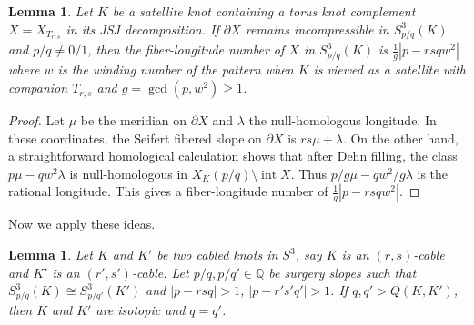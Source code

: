 \documentclass{amsart} %
\newcommand{\Q}{\mathbb{Q}}
\theoremstyle{thm}
\newtheorem{lem}[Theorem]{Lemma}
\theoremstyle{definition}
\numberwithin{equation}{section}
\begin{document}
\begin{lem}\label{lem:fiber_long_torus_piece}
Let $K$ be a satellite knot containing a torus knot complement $X=X_{T_{r,s}}$ in its JSJ decomposition. If $\partial X$ remains incompressible in $S^3_{p/q}(K)$ and $p/q\neq 0/1$, then the fiber-longitude number of $X$ in $S^3_{p/q}(K)$ is $\frac{1}{g}|p-rsqw^2|$ where $w$ is the winding number of the pattern when $K$ is viewed as a satellite with companion $T_{r,s}$ and $g=\gcd(p,w^2)\geq 1$.
\end{lem}
\begin{proof}
Let $\mu$ be the meridian on $\partial X$ and $\lambda$ the null-homologous longitude. In these coordinates, the Seifert fibered slope on $\partial X$ is $rs \mu + \lambda$. On the other hand, a straightforward homological calculation \cite{Gordon1983Satellite} shows that after Dehn filling, the class $p\mu - qw^2 \lambda$ is null-homologous in $X_K(p/q)\setminus \operatorname{int} X$. Thus $p/g\mu - qw^2/g \lambda$ is the rational longitude. This gives a fiber-longitude number of $\frac{1}{g}|p-rsqw^2|$.
\end{proof}

Now we apply these ideas.
\begin{lem}\label{lem:cabled_case}
Let $K$ and $K'$ be two cabled knots in $S^3$, say $K$ is an $(r,s)$-cable and $K'$ is an $(r',s')$-cable. Let $p/q,p/q'\in \Q$ be surgery slopes such that $S_{p/q}^3(K)\cong S_{p/q'}^3(K')$ and $|p-rsq|>1$, $|p-r's'q'|>1$. If $q,q' > Q(K,K')$, then $K$ and $K'$ are isotopic and $q=q'$.
\end{lem}
\end{document}
